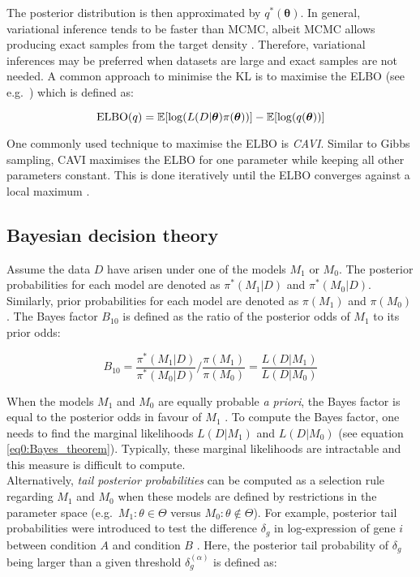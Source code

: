 The posterior distribution is then approximated by $q^\ast(\bm{\theta})$\citep{Blei2017}. 
In general, variational inference tends to be faster than MCMC, albeit MCMC allows producing exact samples from the target density \citep{Blei2017}. 
Therefore, variational inferences may be preferred when datasets are large and exact samples are not needed. 
A common approach to minimise the KL is to maximise the \gls{ELBO} (see e.g.~\citep{Beal2003}) which is defined as:

\begin{equation}
\textnormal{ELBO}(q)=\mathbb{E}[\log(L(D|\bm{\theta})\pi(\bm{\theta}))] - \mathbb{E}[\log(q(\bm{\theta}))]
\end{equation}

One commonly used technique to maximise the ELBO is \emph{\gls{CAVI}}. Similar to Gibbs sampling, CAVI maximises the ELBO for one parameter while keeping all other parameters constant. 
This is done iteratively until the ELBO converges against a local maximum \citep{Blei2017}. 

\subsection{Bayesian decision theory} \label{sec0:decision}

Assume the data $D$ have arisen under one of the models $M_1$ or $M_0$. The posterior probabilities for each model are denoted as $\pi^*(M_1|D)$ and $\pi^*(M_0|D)$. 
Similarly, prior probabilities for each model are denoted as $\pi(M_1)$ and $\pi(M_0)$. The Bayes factor $B_{10}$ \citep{Jeffreys1961} is defined as the ratio of the posterior odds of $M_1$ to its prior odds:

\begin{equation}
B_{10}=\frac{\pi^*(M_1|D)}{\pi^*(M_0|D)}/{}\frac{\pi(M_1)}{\pi(M_0)}=\frac{L(D|M_1)}{L(D|M_0)}
\end{equation}  

When the models $M_1$ and $M_0$ are equally probable \emph{a priori}, the Bayes factor is equal to the posterior odds in favour of $M_1$ \citep{Kass1995}. 
To compute the Bayes factor, one needs to find the marginal likelihoods $L(D|M_1)$ and $L(D|M_0)$ (see equation \eqref{eq0:Bayes_theorem}). 
Typically, these marginal likelihoods are intractable and this measure is difficult to compute. \\

Alternatively, \emph{tail posterior probabilities} can be computed as a selection rule regarding $M_1$ and $M_0$ when these models are defined by restrictions in the parameter space (e.g.~$M_1:\theta\in\Theta$ versus $M_0:\theta\notin\Theta$). 
For example, posterior tail probabilities were introduced to test the difference $\delta_g$ in log-expression of gene $i$ between condition $A$ and condition $B$ \citep{Bochkina2007}. 
Here, the posterior tail probability of $\delta_g$ being larger than a given threshold $\delta_g^{(\alpha)}$ is defined as:

